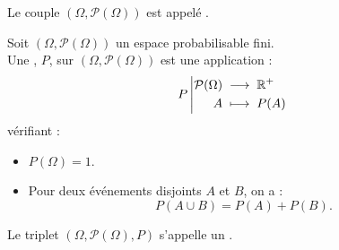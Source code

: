\documentclass{book}
\begin{document}
\begin{Definition}
Le couple $(\Omega,\mathcal{P}(\Omega))$ est appelé .
\end{Definition}

\begin{Definition}
Soit $(\Omega,\mathcal{P}(\Omega))$ un espace probabilisable fini.\\
Une , $P$, sur $(\Omega,\mathcal{P}(\Omega))$ est une application :
\[ {P}\left|\begin{aligned}{\mathcal{P}(\Omega)}&\;\longrightarrow\;{\mathbb{R}^+}\\{A}&\;\longmapsto\;{P(A)}\end{aligned}\right. \]
vérifiant :
\begin{itemize}
\item
  $P(\Omega)=1$.
\item
  Pour deux événements disjoints $A$ et $B$, on a  :
$$P(A\cup B)=P(A)+P(B).$$  
\end{itemize}
Le triplet  $(\Omega,\mathcal{P}(\Omega),P)$ s'appelle un .
\end{Definition}
\end{document}
